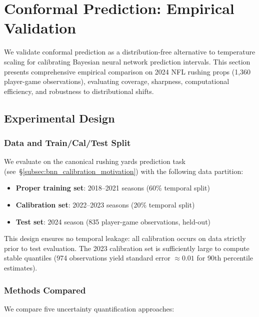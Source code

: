 \section{Conformal Prediction: Empirical Validation}
\label{sec:conformal-empirical}

We validate conformal prediction as a distribution-free alternative to temperature scaling for calibrating Bayesian neural network prediction intervals. This section presents comprehensive empirical comparison on 2024 NFL rushing props (1,360 player-game observations), evaluating coverage, sharpness, computational efficiency, and robustness to distributional shifts.

\subsection{Experimental Design}\label{subsec:conformal-experimental-design}

\subsubsection{Data and Train/Cal/Test Split}

We evaluate on the canonical rushing yards prediction task (see~\S\ref{subsec:bnn_calibration_motivation}) with the following data partition:

\begin{itemize}
    \item \textbf{Proper training set}: 2018--2021 seasons (60\% temporal split)
    \item \textbf{Calibration set}: 2022--2023 seasons (20\% temporal split)
    \item \textbf{Test set}: 2024 season (835 player-game observations, held-out)
\end{itemize}

This design ensures no temporal leakage: all calibration occurs on data strictly prior to test evaluation. The 2023 calibration set is sufficiently large to compute stable quantiles (974 observations yield standard error $\approx 0.01$ for 90th percentile estimates).

\subsubsection{Methods Compared}

We compare five uncertainty quantification approaches:

